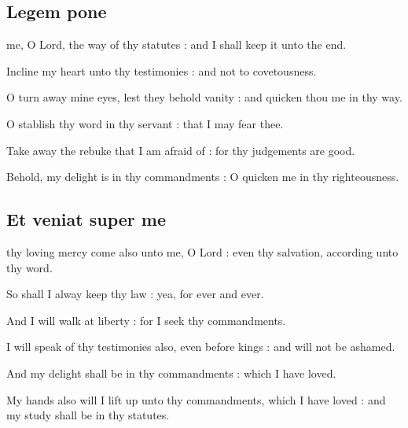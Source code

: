 \subsection{Legem pone}
 me, O Lord, the way of thy statutes : and I shall keep it unto the end.\par
{}
Incline my heart unto thy testimonies : and not to covetousness.\par
{}O turn away mine eyes, lest they behold vanity : and quicken thou me in thy way.\par
{}O stablish thy word in thy servant : that I may fear thee.\par
{}Take away the rebuke that I am afraid of : for thy judgements are good.\par
{}Behold, my delight is in thy commandments : O quicken me in thy righteousness.\par

\subsection{Et veniat super me}
 thy loving mercy come also unto me, O Lord : even thy salvation, according unto thy word.\par
{}
So shall I alway keep thy law : yea, for ever and ever.\par
{}And I will walk at liberty : for I seek thy commandments.\par
{}I will speak of thy testimonies also, even before kings : and will not be ashamed.\par
{}And my delight shall be in thy commandments : which I have loved.\par
{}My hands also will I lift up unto thy commandments, which I have loved : and my study shall be in thy statutes.\par

\clearpage
